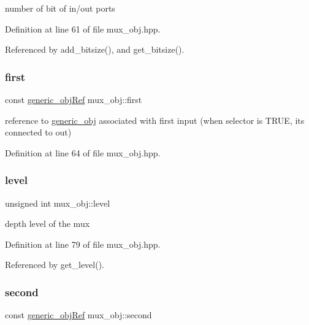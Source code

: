 number of bit of in/out ports 



Definition at line 61 of file mux\+\_\+obj.\+hpp.



Referenced by add\+\_\+bitsize(), and get\+\_\+bitsize().

\mbox{\label{classmux__obj_aa9c5fc6891933d32ba3391f1ab7b191c}} 
\subsubsection{\texorpdfstring{first}{first}}
{\footnotesize\ttfamily const \hyperlink{generic__obj_8hpp_acb533b2ef8e0fe72e09a04d20904ca81}{generic\+\_\+obj\+Ref} mux\+\_\+obj\+::first\hspace{0.3cm}{\ttfamily [private]}}



reference to \hyperlink{classgeneric__obj}{generic\+\_\+obj} associated with first input (when selector is T\+R\+UE, it\textquotesingle{}s connected to out) 



Definition at line 64 of file mux\+\_\+obj.\+hpp.

\mbox{\label{classmux__obj_a1134826e354b1af20b7ea8f260772965}} 
\subsubsection{\texorpdfstring{level}{level}}
{\footnotesize\ttfamily unsigned int mux\+\_\+obj\+::level\hspace{0.3cm}{\ttfamily [private]}}



depth level of the mux 



Definition at line 79 of file mux\+\_\+obj.\+hpp.



Referenced by get\+\_\+level().

\mbox{\label{classmux__obj_ad74f976cc4b0e190b6b33b1f98f87b89}} 
\subsubsection{\texorpdfstring{second}{second}}
{\footnotesize\ttfamily const \hyperlink{generic__obj_8hpp_acb533b2ef8e0fe72e09a04d20904ca81}{generic\+\_\+obj\+Ref} mux\+\_\+obj\+::second\hspace{0.3cm}{\ttfamily [private]}}



